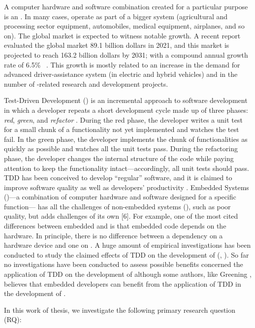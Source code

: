 A computer hardware and software combination created for a particular purpose is an \es. In many cases, \ess operate as part of a bigger system (\eg  agricultural and processing sector equipment, automobiles, medical equipment, airplanes, and so on). The global \ess market is expected to witness notable growth. A recent report evaluated the  global \ess market 89.1 billion dollars in 2021, and this market is projected to reach 163.2 billion dollars by 2031; with a compound annual growth rate of  6.5\%~ \cite{ESSTR2022}. This growth is mostly related to  an increase in the demand for advanced driver-assistance system (in electric and hybrid vehicles) and in the number of \ess-related research and development projects.  


Test-Driven Development (\tdd) is an incremental approach to software development in which a developer repeats a short development cycle made up of three phases: \textit{red}, \textit{green}, and \textit{refactor} \cite{TDDByExample}. During the red phase, the developer writes a unit test for a small chunk of a functionality not yet implemented and watches the test fail. In the green phase, the developer implements the chunk of functionalities as quickly as possible and watches all the unit tests pass. During the refactoring phase, the developer changes the internal structure of the code while paying attention to keep the functionality intact—accordingly, all unit tests should pass. TDD has been conceived to develop “regular” software, and it is claimed to improve software quality as well as developers' productivity \cite{DBLP:reference/se/ErdogmusMJ10}. Embedded Systems (\ess)—a combination of computer hardware and software designed for a specific function— has all the challenges of non-embedded systems (\noess), such as poor quality, but adds challenges of its own [6]. 
For example, one of the most cited differences between embedded and \noess is that embedded code depends on the hardware. In principle, there is no difference between a dependency on a hardware device and one on \noess \cite{TDDEC}. A huge amount of empirical investigations has been conducted to study the claimed effects of TDD on the development of \noess (\eg, \cite{DBLP:journals/software/KaracT18}). So far no investigations have been conducted to assess possible benefits concerned the application of TDD on the development of \ess although some authors, like Greening \cite{TDDEC}, believes that embedded developers can benefit from the application of TDD in the development of \ess.

In this work of thesis, we investigate the following primary research question (RQ):

